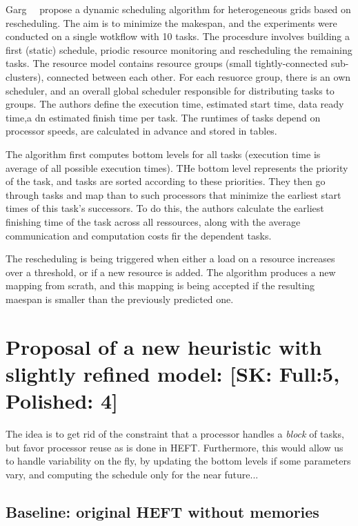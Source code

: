 \documentclass[conference]{IEEEtran}
\newcommand{\skug}[1]{{\color{blue}[SK: #1]}}
\begin{document}
    Garg~\etal~\cite{GARG2015256} propose a dynamic scheduling algorithm for heterogeneous grids based on rescheduling.
    The aim is to minimize the makespan, and the experiments were conducted on a single wotkflow with 10 tasks.
    The procesdure involves building a first (static) schedule, priodic resource monitoring and rescheduling the remaining
    tasks.
    The resource model contains resource groups (small tightly-connected sub-clusters), connected between each other.
    For each resuorce group, there is an own scheduler, and an overall global scheduler responsible for distributing
    tasks to groups.
    The authors define the execution time, estimated start time, data ready time,a dn estimated finish time per task.
    The runtimes of tasks depend on processor speeds, are calculated in advance and stored in tables.

    The algorithm first computes bottom levels for all tasks (execution time is average of all possible execution times).
    THe bottom level represents the priority of the task, and tasks are sorted according to these priorities.
    They then go through tasks and map than to such processors that minimize the earliest start times of this task's
    successors.
    To do this, the authors calculate the earliest finishing time of the task across all ressources, along with the
    average communication and computation costs fir the dependent tasks.

    The rescheduling is being triggered when either a load on a resource increases over a threshold, or if a new resource
    is added.
    The algorithm produces a new mapping from scrath, and this mapping is being accepted if the resulting maespan is
    smaller than the previously predicted one.


    \section{Proposal of a new heuristic with slightly refined model: \skug{Full:5, Polished: 4}}

    The idea is to get rid of the constraint that a processor handles a {\em block} of tasks,
    but favor processor reuse as is done in HEFT.
    Furthermore, this would allow us to handle variability on the fly, by updating
    the bottom levels if some parameters vary, and computing the schedule
    only for the near future...

    \subsection{Baseline: original HEFT without memories}
\end{document}
